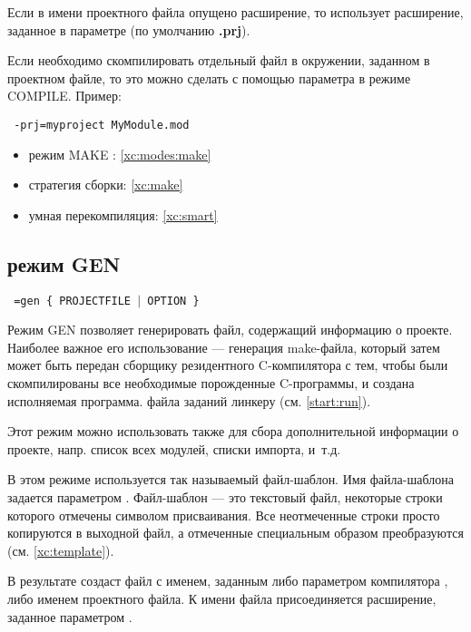 Если в имени проектного файла опущено расширение, то \xds{}
использует расширение, заданное в параметре 
(по умолчанию {\bf .prj}). 

Если необходимо скомпилировать отдельный файл в окружении,
заданном в проектном файле, то это можно сделать с помощью
параметра  в режиме COMPILE. Пример:
\begin{flushleft} \tt
    \xc{} -prj=myproject MyModule.mod
\end{flushleft}

\Seealso
\begin{itemize}
\item   режим MAKE : \ref{xc:modes:make}
\item   стратегия сборки: \ref{xc:make}
\item   умная перекомпиляция: \ref{xc:smart}
\end{itemize}

\subsection{режим GEN}\label{xc:modes:gen}

\begin{flushleft} \tt
    \xc{} =gen \{ PROJECTFILE $|$ OPTION \}
\end{flushleft}
Режим GEN позволяет генерировать файл, содержащий информацию
о проекте. Наиболее важное его использование --- генерация
\ifgenc
  make-файла, который затем может быть передан сборщику
  резидентного C-компилятора с тем, чтобы были скомпилированы все 
  необходимые порожденные C-программы, и создана исполняемая программа.
\else
  файла заданий линкеру (см. \ref{start:run}). %
\fi

Этот режим можно использовать также для сбора дополнительной информации
о проекте, напр. список всех модулей, списки импорта, и~т.д.

В этом режиме используется так называемый файл-шаблон.
Имя файла-шаблона задается параметром .
Файл-шаблон --- это текстовый файл, некоторые строки которого
отмечены символом присваивания. Все неотмеченные строки просто
копируются в выходной файл, а отмеченные специальным образом преобразуются
(см. \ref{xc:template}).

В результате \xds{} создаст файл с именем, заданным либо
параметром компилятора , либо именем проектного
файла. К имени файла присоединяется расширение, заданное параметром
.

